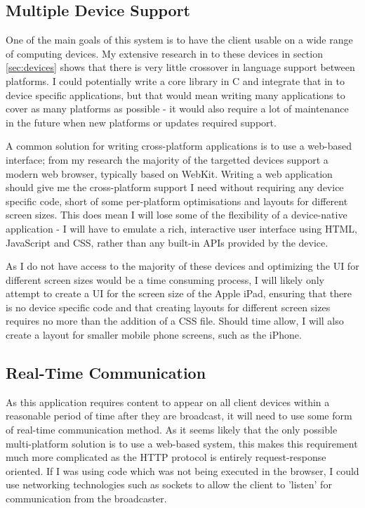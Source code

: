 \documentclass[a4papert,11pt,notitlepage]{ltxdoc}
\begin{document}
\subsection{Multiple Device Support}
One of the main goals of this system is to have the client usable on a wide range of computing devices. My extensive research in to these devices in section \ref{sec:devices} shows that there is very little crossover in language support between platforms. I could potentially write a core library in C and integrate that in to device specific applications, but that would mean writing many applications to cover as many platforms as possible - it would also require a lot of maintenance in the future when new platforms or updates required support.

A common solution for writing cross-platform applications is to use a web-based interface; from my research the majority of the targetted devices support a modern web browser, typically based on WebKit. Writing a web application should give me the cross-platform support I need without requiring any device specific code, short of some per-platform optimisations and layouts for different screen sizes. This does mean I will lose some of the flexibility of a device-native application - I will have to emulate a rich, interactive user interface using HTML, JavaScript and CSS, rather than any built-in APIs provided by the device.

As I do not have access to the majority of these devices and optimizing the UI for different screen sizes would be a time consuming process, I will likely only attempt to create a UI for the screen size of the Apple iPad, ensuring that there is no device specific code and that creating layouts for different screen sizes requires no more than the addition of a CSS file. Should time allow, I will also create a layout for smaller mobile phone screens, such as the iPhone.

\subsection{Real-Time Communication}
As this application requires content to appear on all client devices within a reasonable period of time after they are broadcast, it will need to use some form of real-time communication method. As it seems likely that the only possible multi-platform solution is to use a web-based system, this makes this requirement much more complicated as the HTTP protocol is entirely request-response oriented. If I was using code which was not being executed in the browser, I could use networking technologies such as sockets to allow the client to 'listen' for communication from the broadcaster.
\end{document}
